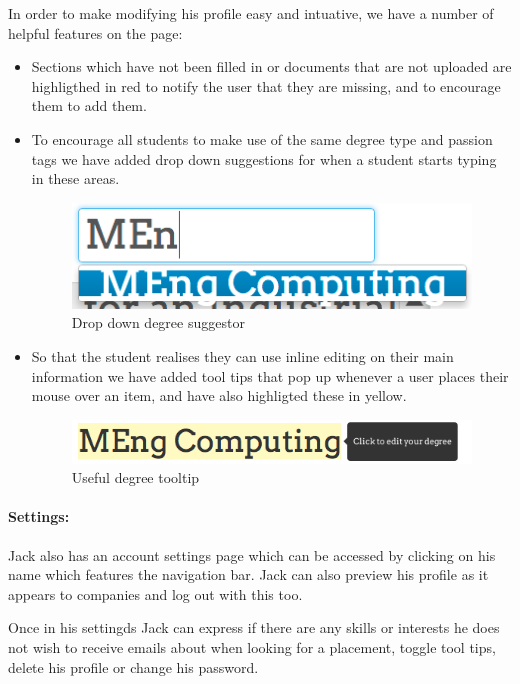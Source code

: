     In order to make modifying his profile easy and intuative, we have a number of helpful features on the page:
    \begin{itemize}
      \item Sections which have not been filled in or documents that are not uploaded are highligthed in red to notify the user that they are missing, and to encourage them to add them.
      \item To encourage all students to make use of the same degree type and passion tags we have added drop down suggestions for when a student starts typing in these areas.

      \begin{figure}[H]\centering
      \includegraphics[scale=0.5]{images/user_experiences/student/edit_suggestions}
      \caption{Drop down degree suggestor}
      \end{figure}
      \item So that the student realises they can use inline editing on their main information we have added tool tips that pop up whenever a user places their mouse over an item, and have also highligted these in yellow.
      
      \begin{figure}[H]\centering
      \includegraphics[scale=0.5]{images/user_experiences/student/edit_degree_tooltip}
      \caption{Useful degree tooltip}
      \end{figure}
    \end{itemize} 

  \paragraph{Settings:}
    Jack also has an account settings page which can be accessed by clicking on his name which features the navigation bar. Jack can also preview his profile as it appears to companies and log out with this too. 

    Once in his settingds Jack can express if there are any skills or interests he does not wish to receive emails about when looking for a placement, toggle tool tips, delete his profile or change his password.

